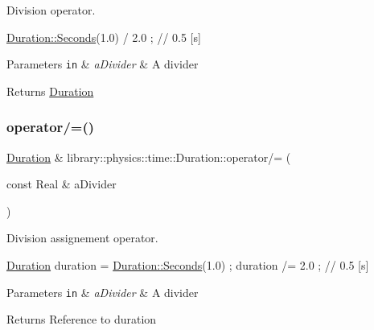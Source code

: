 Division operator. 


\begin{DoxyCode}
\hyperlink{classlibrary_1_1physics_1_1time_1_1_duration_ae10891c94a1b2278c444cb44b37132f1}{Duration::Seconds}(1.0) / 2.0 ; \textcolor{comment}{// 0.5 [s]}
\end{DoxyCode}



\begin{DoxyParams}[1]{Parameters}
\mbox{\tt in}  & {\em a\+Divider} & A divider \\
\hline
\end{DoxyParams}
\begin{DoxyReturn}{Returns}
\hyperlink{classlibrary_1_1physics_1_1time_1_1_duration}{Duration} 
\end{DoxyReturn}
\mbox{\label{classlibrary_1_1physics_1_1time_1_1_duration_a0f57d9d0934d6851e3956744f2e85b48}} 
\subsubsection{\texorpdfstring{operator/=()}{operator/=()}}
{\footnotesize\ttfamily \hyperlink{classlibrary_1_1physics_1_1time_1_1_duration}{Duration} \& library\+::physics\+::time\+::\+Duration\+::operator/= (\begin{DoxyParamCaption}\item[{const Real \&}]{a\+Divider }\end{DoxyParamCaption})}



Division assignement operator. 


\begin{DoxyCode}
\hyperlink{classlibrary_1_1physics_1_1time_1_1_duration_a0a70efcf487a841da572afcf00001f64}{Duration} duration = \hyperlink{classlibrary_1_1physics_1_1time_1_1_duration_ae10891c94a1b2278c444cb44b37132f1}{Duration::Seconds}(1.0) ;
duration /= 2.0 ; \textcolor{comment}{// 0.5 [s]}
\end{DoxyCode}



\begin{DoxyParams}[1]{Parameters}
\mbox{\tt in}  & {\em a\+Divider} & A divider \\
\hline
\end{DoxyParams}
\begin{DoxyReturn}{Returns}
Reference to duration 
\end{DoxyReturn}
\mbox{\label{classlibrary_1_1physics_1_1time_1_1_duration_a90fbdc66d103d7ce07122224db6fc1d9}} 
